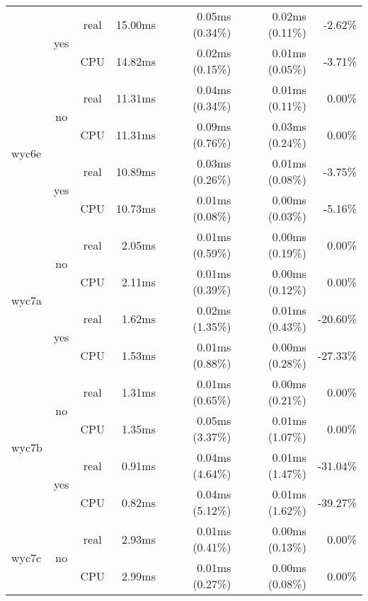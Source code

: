 \documentclass[en]{pracamgr}
\begin{document}
\begin{small}
\begin{longtable}{|l|c|c|r|r|r|r|}
                          \cline{2-7}
                          & \multirow{2}{*}{yes} & real & 15.00ms & 0.05ms (0.34\%) & 0.02ms (0.11\%) & -2.62\% \\*
                          &                      & CPU  & 14.82ms & 0.02ms (0.15\%) & 0.01ms (0.05\%) & -3.71\% \\
\hline
\multirow{4}{*}{wyc6e}    & \multirow{2}{*}{no}  & real & 11.31ms & 0.04ms (0.34\%) & 0.01ms (0.11\%) & 0.00\% \\*
                          &                      & CPU  & 11.31ms & 0.09ms (0.76\%) & 0.03ms (0.24\%) & 0.00\% \\*
                          \cline{2-7}
                          & \multirow{2}{*}{yes} & real & 10.89ms & 0.03ms (0.26\%) & 0.01ms (0.08\%) & -3.75\% \\*
                          &                      & CPU  & 10.73ms & 0.01ms (0.08\%) & 0.00ms (0.03\%) & -5.16\% \\
\hline
\multirow{4}{*}{wyc7a}    & \multirow{2}{*}{no}  & real & 2.05ms & 0.01ms (0.59\%) & 0.00ms (0.19\%) & 0.00\% \\*
                          &                      & CPU  & 2.11ms & 0.01ms (0.39\%) & 0.00ms (0.12\%) & 0.00\% \\*
                          \cline{2-7}
                          & \multirow{2}{*}{yes} & real & 1.62ms & 0.02ms (1.35\%) & 0.01ms (0.43\%) & -20.60\% \\*
                          &                      & CPU  & 1.53ms & 0.01ms (0.88\%) & 0.00ms (0.28\%) & -27.33\% \\
\hline
\multirow{4}{*}{wyc7b}    & \multirow{2}{*}{no}  & real & 1.31ms & 0.01ms (0.65\%) & 0.00ms (0.21\%) & 0.00\% \\*
                          &                      & CPU  & 1.35ms & 0.05ms (3.37\%) & 0.01ms (1.07\%) & 0.00\% \\*
                          \cline{2-7}
                          & \multirow{2}{*}{yes} & real & 0.91ms & 0.04ms (4.64\%) & 0.01ms (1.47\%) & -31.04\% \\*
                          &                      & CPU  & 0.82ms & 0.04ms (5.12\%) & 0.01ms (1.62\%) & -39.27\% \\
\hline
\multirow{4}{*}{wyc7c}    & \multirow{2}{*}{no}  & real & 2.93ms & 0.01ms (0.41\%) & 0.00ms (0.13\%) & 0.00\% \\*
                          &                      & CPU  & 2.99ms & 0.01ms (0.27\%) & 0.00ms (0.08\%) & 0.00\% \\*

\end{longtable}
\end{small}
\end{document}

